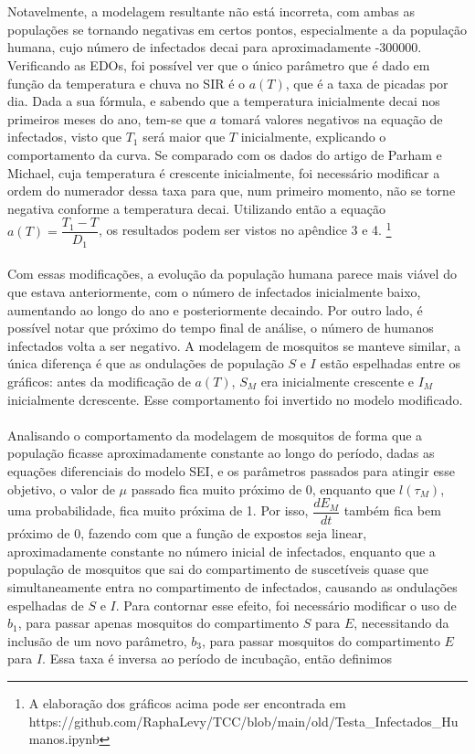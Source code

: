 \documentclass[12pt]{article}
\begin{document}
\\\\
Notavelmente, a modelagem resultante não está incorreta, com ambas as populações se tornando negativas em certos pontos, especialmente a da população humana, cujo número de infectados decai para aproximadamente -300000. Verificando as EDOs, foi possível ver que o único parâmetro que é dado em função da temperatura e chuva no SIR é o $a(T)$, que é a taxa de picadas por dia. Dada a sua fórmula, e sabendo que a temperatura inicialmente decai nos primeiros meses do ano, tem-se que $a$ tomará valores negativos na equação de infectados, visto que $T_1$ será maior que $T$ inicialmente, explicando o comportamento da curva. Se comparado com os dados do artigo de Parham e Michael, cuja temperatura é crescente inicialmente, foi necessário modificar a ordem do numerador dessa taxa para que, num primeiro momento, não se torne negativa conforme a temperatura decai. Utilizando então a equação $a(T) = \dfrac{T_1-T}{D_1}$, os resultados podem ser vistos no apêndice 3 e 4.
\footnote{A elaboração dos gráficos acima pode ser encontrada em
\\
https://github.com/RaphaLevy/TCC/blob/main/old/Testa\_Infectados\_Humanos.ipynb}
\\\\
Com essas modificações, a evolução da população humana parece mais viável do que estava anteriormente, com o número de infectados inicialmente baixo, aumentando ao longo do ano e posteriormente decaindo. Por outro lado, é possível notar que próximo do tempo final de análise, o número de humanos infectados volta a ser negativo. A modelagem de mosquitos se manteve similar, a única diferença é que as ondulações de população $S$ e $I$ estão espelhadas entre os gráficos: antes da modificação de $a(T)$, $S_M$ era inicialmente crescente e $I_M$ inicialmente dcrescente. Esse comportamento foi invertido no modelo modificado.
\\\\
Analisando o comportamento da modelagem de mosquitos de forma que a população ficasse aproximadamente constante ao longo do período, dadas as equações diferenciais do modelo SEI, e os parâmetros passados para atingir esse objetivo, o valor de $\mu$ passado fica muito próximo de 0, enquanto que $l(\tau_M)$, uma probabilidade, fica muito próxima de 1. Por isso, $\dfrac{dE_M}{dt}$ também fica bem próximo de 0, fazendo com que a função de expostos seja linear, aproximadamente constante no número inicial de infectados, enquanto que a população de mosquitos que sai do compartimento de suscetíveis quase que simultaneamente entra no compartimento de infectados, causando as ondulações espelhadas de $S$ e $I$. Para contornar esse efeito, foi necessário modificar o uso de $b_1$, para passar apenas mosquitos do compartimento $S$ para $E$, necessitando da inclusão de um novo parâmetro, $b_3$, para passar mosquitos do compartimento $E$ para $I$. Essa taxa é inversa ao período de incubação, então definimos
\end{document}
